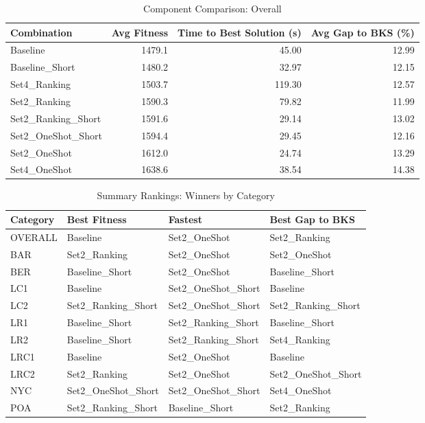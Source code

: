 \documentclass{article}
\begin{document}
\begin{table}[htbp]
\centering
\caption{Component Comparison: Overall}
\label{tab:comparison_overall}
\begin{tabular}{lrrr}
\toprule
Combination & Avg Fitness & Time to Best Solution (s) & Avg Gap to BKS (\%) \\
\midrule
Baseline & 1479.1 & 45.00 & 12.99 \\
Baseline\_Short & 1480.2 & 32.97 & 12.15 \\
Set4\_Ranking & 1503.7 & 119.30 & 12.57 \\
Set2\_Ranking & 1590.3 & 79.82 & 11.99 \\
Set2\_Ranking\_Short & 1591.6 & 29.14 & 13.02 \\
Set2\_OneShot\_Short & 1594.4 & 29.45 & 12.16 \\
Set2\_OneShot & 1612.0 & 24.74 & 13.29 \\
Set4\_OneShot & 1638.6 & 38.54 & 14.38 \\
\bottomrule
\end{tabular}
\end{table}

\begin{table}[htbp]
\centering
\caption{Summary Rankings: Winners by Category}
\label{tab:summary_rankings}
\begin{tabular}{llll}
\toprule
Category & Best Fitness & Fastest & Best Gap to BKS \\
\midrule
OVERALL & Baseline & Set2\_OneShot & Set2\_Ranking \\
BAR & Set2\_Ranking & Set2\_OneShot & Set2\_OneShot \\
BER & Baseline\_Short & Set2\_OneShot & Baseline\_Short \\
LC1 & Baseline & Set2\_OneShot\_Short & Baseline \\
LC2 & Set2\_Ranking\_Short & Set2\_OneShot\_Short & Set2\_Ranking\_Short \\
LR1 & Baseline\_Short & Set2\_Ranking\_Short & Baseline\_Short \\
LR2 & Baseline\_Short & Set2\_Ranking\_Short & Set4\_Ranking \\
LRC1 & Baseline & Set2\_OneShot & Baseline \\
LRC2 & Set2\_Ranking & Set2\_OneShot & Set2\_OneShot\_Short \\
NYC & Set2\_OneShot\_Short & Set2\_OneShot\_Short & Set4\_OneShot \\
POA & Set2\_Ranking\_Short & Baseline\_Short & Set2\_Ranking \\
\bottomrule
\end{tabular}
\end{table}
\end{document}
